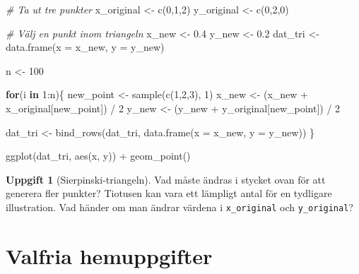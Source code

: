 \documentclass[
]{book}
\newenvironment{Shaded}{\begin{snugshade}}{\end{snugshade}}
\newcommand{\AttributeTok}[1]{\textcolor[rgb]{0.77,0.63,0.00}{#1}}
\newcommand{\CommentTok}[1]{\textcolor[rgb]{0.56,0.35,0.01}{\textit{#1}}}
\newcommand{\ControlFlowTok}[1]{\textcolor[rgb]{0.13,0.29,0.53}{\textbf{#1}}}
\newcommand{\DecValTok}[1]{\textcolor[rgb]{0.00,0.00,0.81}{#1}}
\newcommand{\FloatTok}[1]{\textcolor[rgb]{0.00,0.00,0.81}{#1}}
\newcommand{\FunctionTok}[1]{\textcolor[rgb]{0.00,0.00,0.00}{#1}}
\newcommand{\NormalTok}[1]{#1}
\newcommand{\OtherTok}[1]{\textcolor[rgb]{0.56,0.35,0.01}{#1}}
\newcommand{\SpecialCharTok}[1]{\textcolor[rgb]{0.00,0.00,0.00}{#1}}
\theoremstyle{definition}
\theoremstyle{definition}
\theoremstyle{definition}
\newtheorem{exercise}{Uppgift}[chapter]
\theoremstyle{definition}
\theoremstyle{remark}
\begin{document}
\begin{Shaded}
\begin{Highlighting}[]
\CommentTok{\# Ta ut tre punkter}
\NormalTok{x\_original }\OtherTok{\textless{}{-}} \FunctionTok{c}\NormalTok{(}\DecValTok{0}\NormalTok{,}\DecValTok{1}\NormalTok{,}\DecValTok{2}\NormalTok{)}
\NormalTok{y\_original }\OtherTok{\textless{}{-}} \FunctionTok{c}\NormalTok{(}\DecValTok{0}\NormalTok{,}\DecValTok{2}\NormalTok{,}\DecValTok{0}\NormalTok{)}

\CommentTok{\# Välj en punkt inom triangeln}
\NormalTok{x\_new }\OtherTok{\textless{}{-}} \FloatTok{0.4}
\NormalTok{y\_new }\OtherTok{\textless{}{-}} \FloatTok{0.2}
\NormalTok{dat\_tri }\OtherTok{\textless{}{-}} \FunctionTok{data.frame}\NormalTok{(}\AttributeTok{x =}\NormalTok{ x\_new, }\AttributeTok{y =}\NormalTok{ y\_new)}

\NormalTok{n }\OtherTok{\textless{}{-}} \DecValTok{100}

\ControlFlowTok{for}\NormalTok{(i }\ControlFlowTok{in} \DecValTok{1}\SpecialCharTok{:}\NormalTok{n)\{}
\NormalTok{  new\_point }\OtherTok{\textless{}{-}} \FunctionTok{sample}\NormalTok{(}\FunctionTok{c}\NormalTok{(}\DecValTok{1}\NormalTok{,}\DecValTok{2}\NormalTok{,}\DecValTok{3}\NormalTok{), }\DecValTok{1}\NormalTok{)}
\NormalTok{  x\_new }\OtherTok{\textless{}{-}}\NormalTok{ (x\_new }\SpecialCharTok{+}\NormalTok{ x\_original[new\_point]) }\SpecialCharTok{/} \DecValTok{2}
\NormalTok{  y\_new }\OtherTok{\textless{}{-}}\NormalTok{ (y\_new }\SpecialCharTok{+}\NormalTok{ y\_original[new\_point]) }\SpecialCharTok{/} \DecValTok{2}
  
\NormalTok{  dat\_tri }\OtherTok{\textless{}{-}} \FunctionTok{bind\_rows}\NormalTok{(dat\_tri, }\FunctionTok{data.frame}\NormalTok{(}\AttributeTok{x =}\NormalTok{ x\_new, }\AttributeTok{y =}\NormalTok{ y\_new))}
\NormalTok{\}}

\FunctionTok{ggplot}\NormalTok{(dat\_tri, }\FunctionTok{aes}\NormalTok{(x, y)) }\SpecialCharTok{+}
  \FunctionTok{geom\_point}\NormalTok{()}
\end{Highlighting}
\end{Shaded}

\begin{exercise}[Sierpinski-triangeln]
Vad måste ändras i stycket ovan för att generera fler punkter? Tiotusen kan vara ett lämpligt antal för en tydligare illustration. Vad händer om man ändrar värdena i \texttt{x\_original} och \texttt{y\_original}?
\end{exercise}

\hypertarget{valfria-hemuppgifter-2}{%
\section{Valfria hemuppgifter}\label{valfria-hemuppgifter-2}}
\end{document}
